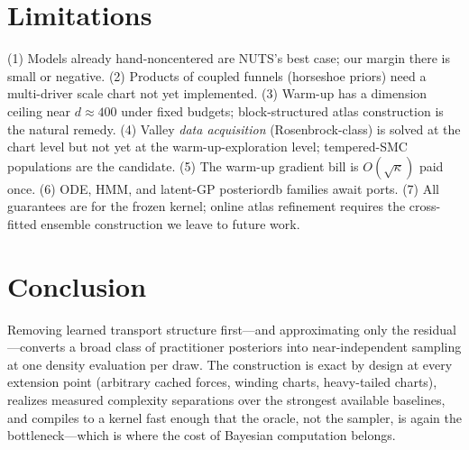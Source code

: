 \documentclass[10pt,journal,compsoc]{IEEEtran}
\begin{document}
\section{Limitations}\label{sec:lim}
(1) Models already hand-noncentered are NUTS's best case; our margin there
is small or negative. (2) Products of coupled funnels (horseshoe priors)
need a multi-driver scale chart not yet implemented. (3) Warm-up has a
dimension ceiling near $d\approx400$ under fixed budgets; block-structured
atlas construction is the natural remedy. (4) Valley
\emph{data acquisition} (Rosenbrock-class) is solved at the chart level but
not yet at the warm-up-exploration level; tempered-SMC populations are the
candidate. (5) The warm-up gradient bill is $O(\sqrt\kappa)$ paid once.
(6) ODE, HMM, and latent-GP posteriordb families await ports. (7) All
guarantees are for the frozen kernel; online atlas refinement requires the
cross-fitted ensemble construction we leave to future work.

\section{Conclusion}
Removing learned transport structure first---and approximating only the
residual---converts a broad class of practitioner posteriors into
near-independent sampling at one density evaluation per draw. The
construction is exact by design at every extension point (arbitrary cached
forces, winding charts, heavy-tailed charts), realizes measured complexity
separations over the strongest available baselines, and compiles to a
kernel fast enough that the oracle, not the sampler, is again the
bottleneck---which is where the cost of Bayesian computation belongs.
\end{document}
